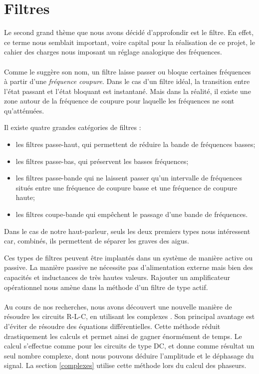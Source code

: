 \section{Filtres}
Le second grand thème que nous avons décidé d'approfondir est le filtre. En effet, ce terme nous semblait 
important, voire capital pour la réalisation de ce projet, le cahier des charges nous imposant un réglage 
analogique des fréquences.

\paragraph{}
Comme le suggère son nom, un filtre laisse passer ou bloque certaines fréquences à partir d'une \emph{fréquence coupure}. Dans le cas d'un filtre idéal, la transition entre l'état passant et l'état bloquant est instantané. Mais dans la réalité, il existe une zone autour de la fréquence de coupure pour laquelle les fréquences ne sont qu'atténuées. 

Il existe quatre grandes catégories de filtres \cite{Kularatna} : 
\begin{itemize}
\item les filtres passe-haut, qui permettent de réduire la bande de fréquences basses;
\item les filtres passe-bas, qui préservent les basses fréquences;
\item les filtres passe-bande qui ne laissent passer qu'un intervalle de fréquences situés entre une fréquence de coupure basse et une fréquence de coupure haute;
\item les filtres coupe-bande qui empêchent le passage d'une bande de fréquences.
\end{itemize}
Dans le cas de notre haut-parleur, seuls les deux premiers types nous intéressent car, combinés, ils permettent de séparer les graves des aigus.

Ces types de filtres peuvent être implantés dans un système de manière active ou passive. La manière passive ne nécessite pas d'alimentation externe mais bien des 
capacités et inductances de très hautes valeurs. Rajouter un amplificateur opérationnel nous amène dans la méthode d'un filtre de type actif. \cite{Kularatna}

\paragraph{}
Au cours de nos recherches, nous avons découvert une nouvelle manière de résoudre les circuits R-L-C, en utilisant les 
complexes \cite{Irwin}. Son principal avantage est d'éviter de résoudre des équations différentielles. Cette méthode réduit drastiquement les calculs et permet ainsi de gagner énormément de temps. Le calcul s'effectue comme pour les circuits de type DC, et donne comme résultat un seul nombre complexe, dont nous pouvons déduire l'amplitude et le déphasage du signal.
La section \ref{complexes} utilise cette méthode lors du calcul des phaseurs. 
